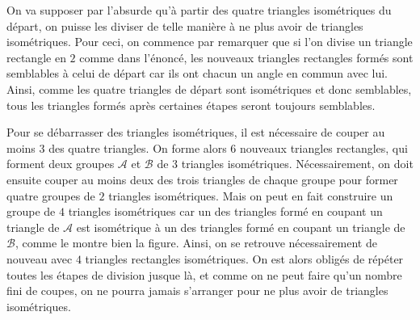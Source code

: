 On va supposer par l'absurde qu'à partir des quatre triangles isométriques du départ, on puisse les diviser de telle manière à ne plus avoir de triangles isométriques. Pour ceci, on commence par remarquer que si l'on divise un triangle rectangle en $2$ comme dans l'énoncé, les nouveaux triangles rectangles formés sont semblables à celui de départ car ils ont chacun un angle en commun avec lui. Ainsi, comme les quatre triangles de départ sont isométriques et donc semblables, tous les triangles formés après certaines étapes seront toujours semblables.

Pour se débarrasser des triangles isométriques, il est nécessaire de couper au moins $3$ des quatre triangles. On forme alors $6$ nouveaux triangles rectangles, qui forment deux groupes $\mathcal{A}$ et $\mathcal{B}$ de $3$ triangles isométriques. Nécessairement, on doit ensuite couper au moins deux des trois triangles de chaque groupe pour former quatre groupes de $2$ triangles isométriques. Mais on peut en fait construire un groupe de $4$ triangles isométriques car un des triangles formé en coupant un triangle de $\mathcal{A}$ est isométrique à un des triangles formé en coupant un triangle de $\mathcal{B}$, comme le montre bien la figure. Ainsi, on se retrouve nécessairement de nouveau avec $4$ triangles rectangles isométriques. On est alors obligés de répéter toutes les étapes de division jusque là, et comme on ne peut faire qu'un nombre fini de coupes, on ne pourra jamais s'arranger pour ne plus avoir de triangles isométriques.

\begin{center}
\end{center}